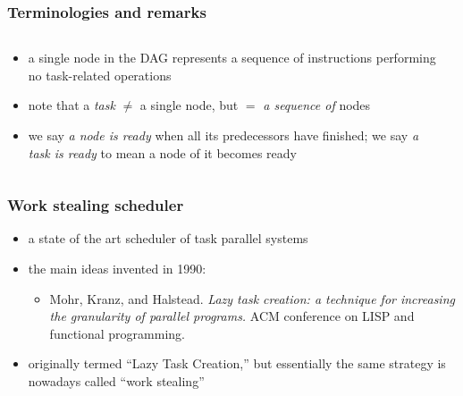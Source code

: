 \documentclass[12pt,dvipdfmx]{beamer}
\newcommand{\ao}[1]{{\color{blue}#1}}
\newcommand{\aka}[1]{{\color{red}#1}}
\begin{document}
\begin{frame}
\frametitle{Terminologies and remarks}
\begin{columns}
\begin{column}{0.7\textwidth}
\begin{itemize}
\item a single node in the DAG represents 
  a sequence of instructions performing
  no task-related operations

\item note that a \ao{\em task} $\neq$ a single
  node, but $=$ \aka{\em a sequence of} nodes

\item we say \ao{\em a node is ready} when all its
  predecessors have finished; we say 
  \ao{\em a task is ready} to mean a node of it becomes ready
\end{itemize}
\end{column}
\begin{column}{0.3\textwidth}
\begin{center}
\def\svgwidth{0.8\textwidth}
{\footnotesize }
\end{center}
\end{column}
\end{columns}
\end{frame}


\begin{frame}
\frametitle{Work stealing scheduler}
\begin{itemize}
\item a state of the art scheduler of task parallel systems
\item the main ideas invented in 1990:
  \begin{itemize}
  \item []
    Mohr, Kranz, and Halstead. 
    {\em Lazy task creation: a technique for increasing the granularity of parallel programs.}
    ACM conference on LISP and functional programming.
  \end{itemize}
\item originally termed ``Lazy Task Creation,'' 
  but essentially the same strategy is nowadays called ``work stealing''
\end{itemize}
\end{frame}
\end{document}
